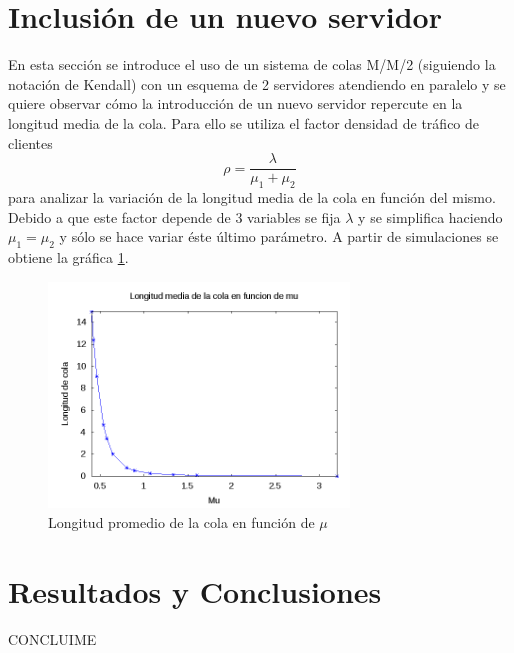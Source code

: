 \documentclass{sig-alternate}
\begin{document}
\section{Inclusi\'on de un nuevo servidor}
\label{sec:mm2}

En esta secci\'on se introduce el uso de un sistema de colas M/M/2 (siguiendo la notaci\'on de Kendall)
con un esquema de 2 servidores atendiendo en paralelo y se quiere observar c\'omo la introducci\'on
de un nuevo servidor repercute en la longitud media de la cola. Para ello se utiliza el factor densidad de tr\'afico de clientes
\begin{equation}
\rho = \frac{\lambda}{\mu_{1} + \mu_{2}}
\end{equation}
para analizar la variaci\'on de la longitud media de la cola en funci\'on del mismo.
Debido a que este factor depende de 3 variables se fija $\lambda$ y se simplifica haciendo
$\mu_{1}=\mu_{2}$ y s\'olo se hace variar \'este \'ultimo par\'ametro.
A partir de simulaciones se obtiene la gr\'afica \ref{fig:mu}.

\begin{figure}[ht]
\begin{center}
\includegraphics[width=8cm]{mm2-mu}
\caption{\label{fig:mu} Longitud promedio de la cola en funci\'on de $\mu$}
\end{center}
\end{figure}

\section{Resultados y Conclusiones}
\label{sec:conclusiones}
CONCLUIME



\end{document}

